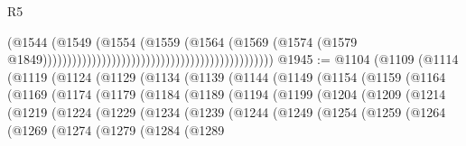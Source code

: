 \begin{lexlean}{R5}
\begin{coremodule}
                                                                                  (@1544
                                                                                    (@1549
                                                                                      (@1554
                                                                                        (@1559
                                                                                          (@1564
                                                                                            (@1569
                                                                                              (@1574
                                                                                                (@1579
                                                                                                  @1849)))))))))))))))))))))))))))))))))))))))))))))))
@1945 := @1104
    (@1109
      (@1114
        (@1119
          (@1124
            (@1129
              (@1134
                (@1139
                  (@1144
                    (@1149
                      (@1154
                        (@1159
                          (@1164
                            (@1169
                              (@1174
                                (@1179
                                  (@1184
                                    (@1189
                                      (@1194
                                        (@1199
                                          (@1204
                                            (@1209
                                              (@1214
                                                (@1219
                                                  (@1224
                                                    (@1229
                                                      (@1234
                                                        (@1239
                                                          (@1244
                                                            (@1249
                                                              (@1254
                                                                (@1259
                                                                  (@1264
                                                                    (@1269
                                                                      (@1274
                                                                        (@1279
                                                                          (@1284
                                                                            (@1289

\end{coremodule}
\end{lexlean}
